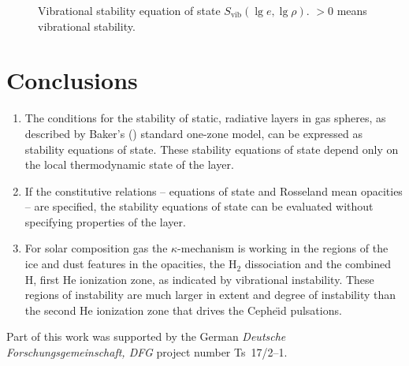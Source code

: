 \documentclass{aa}
\begin{document}
%
   \begin{figure}
   \centering
      \caption{Vibrational stability equation of state
               $S_{\mathrm{vib}}(\lg e, \lg \rho)$.
               $>0$ means vibrational stability.
              }
         \label{FigVibStab}
   \end{figure}
%

\section{Conclusions}

   \begin{enumerate}
      \item The conditions for the stability of static, radiative
         layers in gas spheres, as described by Baker's (\cite{baker})
         standard one-zone model, can be expressed as stability
         equations of state. These stability equations of state depend
         only on the local thermodynamic state of the layer.
      \item If the constitutive relations -- equations of state and
         Rosseland mean opacities -- are specified, the stability
         equations of state can be evaluated without specifying
         properties of the layer.
      \item For solar composition gas the $\kappa$-mechanism is
         working in the regions of the ice and dust features
         in the opacities, the $\mathrm{H}_2$ dissociation and the
         combined H, first He ionization zone, as
         indicated by vibrational instability. These regions
         of instability are much larger in extent and degree of
         instability than the second He ionization zone
         that drives the Cephe{\"\i}d pulsations.
   \end{enumerate}

\begin{acknowledgements}
      Part of this work was supported by the German
      \emph{Deut\-sche For\-schungs\-ge\-mein\-schaft, DFG\/} project
      number Ts~17/2--1.
\end{acknowledgements}


\end{document}
